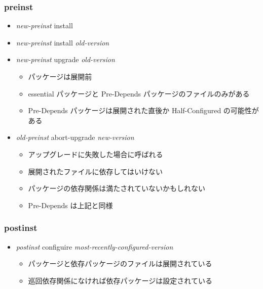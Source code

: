\documentclass[mingoth,a4paper]{jsarticle}
\begin{document}
\subsubsection{preinst}

\begin{itemize}
\item {\it new-preinst} install
\item {\it new-preinst} install {\it old-version}
\item {\it new-preinst} upgrade {\it old-version}
  \begin{itemize}
  \item パッケージは展開前
  \item essential パッケージと Pre-Depends パッケージのファイルのみがある
  \item Pre-Depends パッケージは展開された直後か Half-Configured の可能性がある
  \end{itemize}
\end{itemize}

\begin{itemize}
\item {\it old-preinst} abort-upgrade {\it new-version}
  \begin{itemize}
  \item アップグレードに失敗した場合に呼ばれる
  \item 展開されたファイルに依存してはいけない
  \item パッケージの依存関係は満たされていないかもしれない
  \item Pre-Depends は上記と同様
  \end{itemize}
\end{itemize}


\clearpage

\subsubsection{postinst}

\begin{itemize}
\item {\it postinst} configuire {\it most-recently-configured-version}
  \begin{itemize}
  \item パッケージと依存パッケージのファイルは展開されている
  \item 巡回依存関係になければ依存パッケージは設定されている
  \end{itemize}
\end{itemize}
\end{document}
